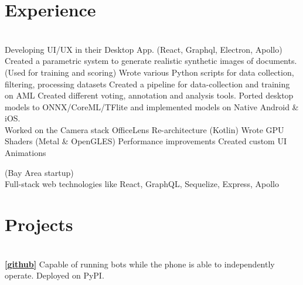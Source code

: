 \documentclass[]{deedy-resume-openfont}
\begin{document}
\begin{minipage}[t]{0.66\textwidth} 


\section{Experience}
\\
Developing UI/UX in their Desktop App. (React, Graphql, Electron, Apollo)\\
\textbullet Created a parametric system to generate realistic synthetic images of documents. (Used for training and scoring)
\textbullet Wrote various Python scripts for data collection, filtering, processing datasets \textbullet Created a pipeline for data-collection and training on AML \textbullet Created different voting, annotation and analysis tools.  \textbullet Ported desktop models to ONNX/CoreML/TFlite and implemented models on Native Android \& iOS. \\
\textbullet  Worked on the Camera stack \textbullet  OfficeLens Re-architecture (Kotlin) \textbullet  Wrote GPU Shaders (Metal \& OpenGLES) \textbullet  Performance improvements
\textbullet Created custom UI Animations 

\sectionsep

 (Bay Area startup) \\
Full-stack web technologies like React, GraphQL, Sequelize, Express, Apollo


\section{Projects}
\\
\textbf{\href{https://github.com/mukulhase/WhatsAPI}{[\underline{github}]}} Capable of running bots while the phone is able to independently operate. Deployed on PyPI.
\sectionsep


\end{minipage}
\end{document}
